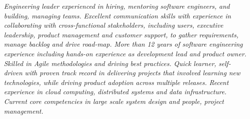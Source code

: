 {\selectfont
\begin{justify}\textit{Engineering leader experienced in hiring, mentoring software engineers, and building, managing teams. Excellent communication skills with experience in collaborating with cross-functional stakeholders, including users, executive leadership, product management and customer support, to gather requirements, manage backlog and drive road-map. More than 12 years of software engineering experience including hands-on experience as development lead and product owner. Skilled in Agile methodologies and driving best practices. Quick learner, self-driven with proven track record in delivering projects that involved learning new technologies, while driving product adoption across multiple releases. Recent experience in cloud computing, distributed systems and data infrastructure. Current core competencies in large scale system design and people, project management.}\end{justify}
}